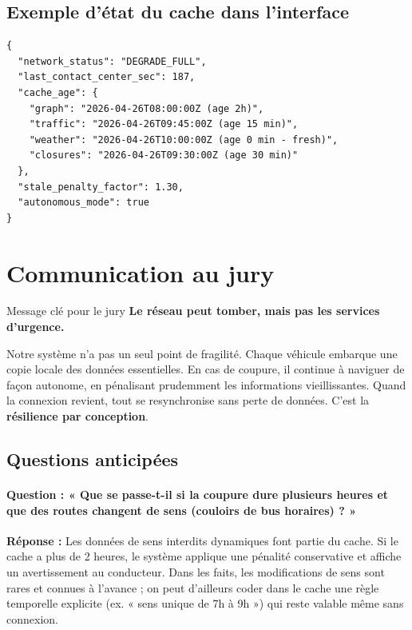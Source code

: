 \documentclass[12pt,a4paper]{article}
\theoremstyle{definition}
\theoremstyle{remark}
\begin{document}
\subsection{Exemple d’état du cache dans l’interface}

\begin{verbatim}
{
  "network_status": "DEGRADE_FULL",
  "last_contact_center_sec": 187,
  "cache_age": {
    "graph": "2026-04-26T08:00:00Z (age 2h)",
    "traffic": "2026-04-26T09:45:00Z (age 15 min)",
    "weather": "2026-04-26T10:00:00Z (age 0 min - fresh)",
    "closures": "2026-04-26T09:30:00Z (age 30 min)"
  },
  "stale_penalty_factor": 1.30,
  "autonomous_mode": true
}
\end{verbatim}

\newpage

\section{Communication au jury}

\begin{jurybox}{Message clé pour le jury}
\textbf{Le réseau peut tomber, mais pas les services d’urgence.}

\medskip
Notre système n’a pas un seul point de fragilité. Chaque véhicule
embarque une copie locale des données essentielles. En cas de coupure,
il continue à naviguer de façon autonome, en pénalisant prudemment
les informations vieillissantes. Quand la connexion revient, tout
se resynchronise sans perte de données. C’est la \textbf{résilience
par conception}.
\end{jurybox}

\subsection{Questions anticipées}

\paragraph{Question : « Que se passe-t-il si la coupure dure plusieurs heures
et que des routes changent de sens (couloirs de bus horaires) ? »}
\textbf{Réponse :} Les données de sens interdits dynamiques font partie
du cache. Si le cache a plus de 2 heures, le système applique une
pénalité conservative et affiche un avertissement au conducteur.
Dans les faits, les modifications de sens sont rares et connues à
l’avance ; on peut d’ailleurs coder dans le cache une règle temporelle
explicite (ex. « sens unique de 7h à 9h ») qui reste valable même
sans connexion.
\end{document}

